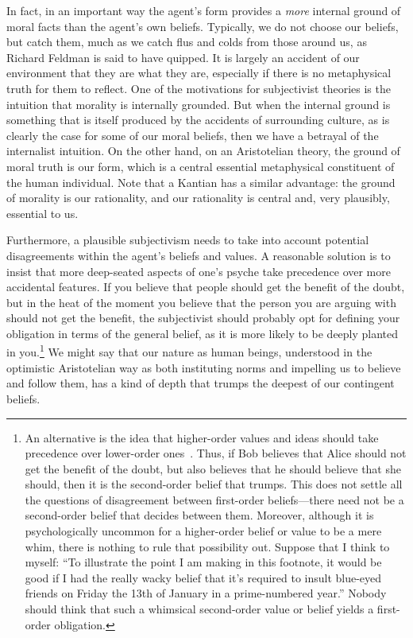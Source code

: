 In fact, in an important way the agent's form provides a \textit{more} internal ground of moral facts than the 
agent's own beliefs. Typically, we do not choose our beliefs, but catch them, much as we 
catch flus and colds from those around us, as Richard Feldman is said to have quipped. It is largely an accident of our environment that they are what they are, especially 
if there is no metaphysical truth for them to reflect. One of the motivations for subjectivist theories is 
the intuition that morality is internally grounded. But when the internal ground is something that is itself
produced by the accidents of surrounding culture, as is clearly the case for some of our moral beliefs, 
then we have a betrayal of the internalist intuition. On the other hand, on an Aristotelian theory, the ground 
of moral truth is our form, which is a central essential metaphysical constituent of the human individual. 
Note that a Kantian has a similar advantage: the ground of morality is our rationality, and our rationality
is central and, very plausibly, essential to us.

Furthermore, a plausible subjectivism needs to take into account potential disagreements within the agent's 
beliefs and values. A reasonable solution is to insist that more deep-seated aspects of one's psyche take 
precedence over more accidental features. If you believe that people should get the benefit of the doubt, but 
in the heat of the moment you believe that the person you are arguing with should not get the benefit, the 
subjectivist should probably opt for defining your obligation in terms of the general belief, as it is more 
likely to be deeply planted in you.\footnote{An alternative is the idea that higher-order values and
ideas should take precedence over lower-order ones~. Thus, if Bob believes that Alice should not get the benefit
of the doubt, but also believes that he should believe that she should, then it is the second-order belief that
trumps. This does not settle all the questions of disagreement between first-order beliefs---there need not be a 
second-order belief that decides between them. Moreover, although it is psychologically uncommon for a higher-order
belief or value to be a mere whim, there is nothing to rule that possibility out. Suppose that I think to myself:
``To illustrate the point I am making in this footnote, it would be good if I had the really wacky belief that
it's required to insult blue-eyed friends on Friday the 13th of January in a prime-numbered year.'' Nobody
should think that such a whimsical second-order value or belief yields a first-order obligation.} We might say 
that our nature as human beings, understood in the optimistic Aristotelian way as both instituting norms and impelling us 
to believe and follow them, has a kind of depth that trumps the deepest of our contingent beliefs.

